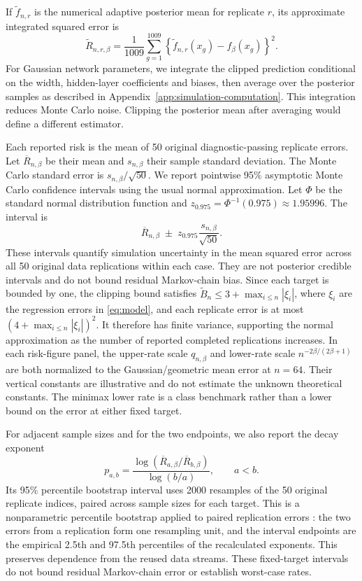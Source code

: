 \documentclass[11pt,a4paper]{article}
\theoremstyle{remark}
\begin{document}
If $\widetilde f_{n,r}$ is the numerical adaptive posterior mean for
replicate $r$, its approximate integrated squared error is
\begin{equation}\label{eq:simulation-risk}
\widetilde R_{n,r,\beta}=\frac1{1009}\sum_{g=1}^{1009}
\left\{\widetilde f_{n,r}(x_g)-f_\beta(x_g)\right\}^2.
\end{equation}
{For Gaussian network parameters, we integrate the clipped prediction conditional
on the width, hidden-layer coefficients and biases, then average over
the posterior samples as described in Appendix~\ref{app:simulation-computation}.
This integration reduces Monte Carlo noise. Clipping the posterior
mean after averaging would define a different estimator.}

Each reported risk is the mean of 50 original diagnostic-passing
replicate errors. Let $\overline R_{n,\beta}$ be their mean and
$s_{n,\beta}$ their sample standard deviation. The Monte Carlo
standard error is $s_{n,\beta}/\sqrt{50}$. We report pointwise 95\%
asymptotic Monte Carlo confidence intervals using the usual
normal approximation. Let $\Phi$ be the standard normal distribution
function and $z_{0.975}=\Phi^{-1}(0.975)\approx1.95996$. The interval is
\[
\overline R_{n,\beta}\;\pm\;
z_{0.975}\frac{s_{n,\beta}}{\sqrt{50}}.
\]
These intervals quantify simulation uncertainty in the mean squared error
across all 50 original data replications within each case. They are not posterior
credible intervals and do not bound residual Markov-chain bias.
Since each target is bounded by one, the clipping bound satisfies
$\widetilde B_n\leq3+\max_{i\leq n}|\xi_i|$, where $\xi_i$ are the regression errors in \eqref{eq:model}, and each replicate
error is at most $(4+\max_{i\leq n}|\xi_i|)^2$. It therefore has
finite variance, supporting the normal approximation as the number
of reported completed replications increases.
In each risk-figure panel, the upper-rate scale $q_{n,\beta}$ and
lower-rate scale $n^{-2\beta/(2\beta+1)}$ are both normalized to the
Gaussian/geometric mean error at $n=64$. Their vertical constants
are illustrative and do not estimate the unknown theoretical
constants. The minimax lower rate is a class benchmark rather than
a lower bound on the error at either fixed target.

For adjacent sample sizes and for the two endpoints, we also report
the decay exponent
\[
p_{a,b}=\frac{\log(\overline R_{a,\beta}/\overline R_{b,\beta})}
{\log(b/a)},\qquad a<b.
\]
Its 95\% percentile bootstrap interval uses 2000 resamples of the 50 original replicate indices, paired across sample sizes for each target. This is a nonparametric percentile bootstrap applied to paired replication errors \citep[Sections~2, 7--8]{efron1985bootstrap}: the two errors from a replication form one resampling unit, and the interval endpoints are the empirical 2.5th and 97.5th percentiles of the recalculated exponents. This preserves dependence from the reused data streams. These fixed-target intervals do not bound residual Markov-chain error or establish worst-case rates.
\end{document}
